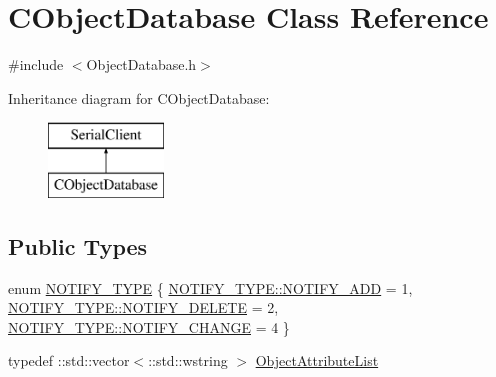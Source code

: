 \hypertarget{class_c_object_database}{}\section{C\+Object\+Database Class Reference}
\label{class_c_object_database}


{\ttfamily \#include $<$Object\+Database.\+h$>$}

Inheritance diagram for C\+Object\+Database\+:\begin{figure}[H]
\begin{center}
\leavevmode
\includegraphics[height=2.000000cm]{class_c_object_database}
\end{center}
\end{figure}
\subsection*{Public Types}
\begin{DoxyCompactItemize}
\item 
enum \hyperlink{class_c_object_database_aa0aa75b7f8685e54d75b0ef166c503a8}{N\+O\+T\+I\+F\+Y\+\_\+\+T\+Y\+P\+E} \{ \hyperlink{class_c_object_database_aa0aa75b7f8685e54d75b0ef166c503a8ad32c7592a66e6e96f15b43c9d9f13846}{N\+O\+T\+I\+F\+Y\+\_\+\+T\+Y\+P\+E\+::\+N\+O\+T\+I\+F\+Y\+\_\+\+A\+D\+D} = 1, 
\hyperlink{class_c_object_database_aa0aa75b7f8685e54d75b0ef166c503a8a3d2b0ba9bc47406c9c5abeccfcdba46e}{N\+O\+T\+I\+F\+Y\+\_\+\+T\+Y\+P\+E\+::\+N\+O\+T\+I\+F\+Y\+\_\+\+D\+E\+L\+E\+T\+E} = 2, 
\hyperlink{class_c_object_database_aa0aa75b7f8685e54d75b0ef166c503a8aa9649df4997d00fcfd6e3747944bcff7}{N\+O\+T\+I\+F\+Y\+\_\+\+T\+Y\+P\+E\+::\+N\+O\+T\+I\+F\+Y\+\_\+\+C\+H\+A\+N\+G\+E} = 4
 \}
\item 
typedef \+::std\+::vector$<$\+::std\+::wstring $>$ \hyperlink{class_c_object_database_a9df75a00043b777e5fc5857577003db2}{Object\+Attribute\+List}
\end{DoxyCompactItemize}
